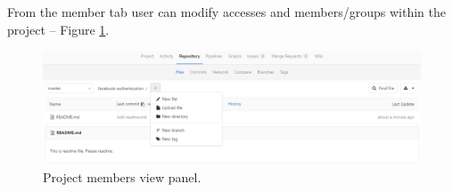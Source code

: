 	From the member tab user can modify accesses and members/groups within the project -- Figure \ref{fig:project-members}.
	\begin{figure}[!htbp]
		\centering
		\includegraphics[width=1\textwidth]{img/ug-project/project-view-repository}
		\caption{Project members view panel.}
		\label{fig:project-members}
	\end{figure}